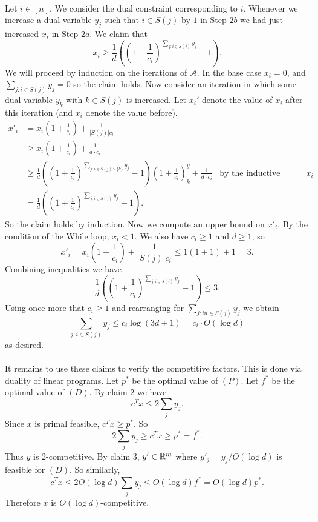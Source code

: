 \documentclass[letterpaper,12pt,oneside,onecolumn]{article}
\newcommand{\cA}{\mathcal{A}} \newcommand{\cB}{\mathcal{B}}
\newenvironment{proof}{{\bf Proof:  }}{\hfill\rule{2mm}{2mm}}
\begin{document}
\begin{proof}
\paragraph{}
Let $i \in [n]$. We consider the dual constraint corresponding to $i$. Whenever we increase a dual variable $y_j$ such that $i \in S(j)$ by $1$ in Step $2b$ we had just increased $x_i$ in Step $2a$. We claim that 
$$x_i \geq \frac{1}{d}((1+\frac{1}{c_i})^{\sum_{j : i \in S(j)} y_j} - 1).$$
We will proceed by induction on the iterations of $\cA$. In the base case $x_i = 0$, and $\sum_{j : i \in S(j)} y_j = 0$ so the claim holds. Now consider an iteration in which some dual variable $y_k$ with $k \in S(j)$ is increased. Let $x_i'$ denote the value of $x_i$ after this iteration (and $x_i$ denote the value before).
\begin{align*}
x'_i &= x_i(1 + \frac{1}{c_i}) + \frac{1}{|S(j)|c_i} \\
&\geq x_i(1+\frac{1}{c_i}) + \frac{1}{d\cdot c_i} \\
&\geq \frac{1}{d}((1+\frac{1}{c_i})^{\sum_{j : i \in S(j)\backslash\{k\}}y_j} - 1)(1 + \frac{1}{c_i})^y_k + \frac{1}{d\cdot c_i} &\text{by the inductive hypothesis on $x_i$} \\
&= \frac{1}{d}((1+\frac{1}{c_i})^{\sum_{j :i \in S(j)} y_j} -1).
\end{align*}
So the claim holds by induction. Now we compute an upper bound on $x'_i$. By the condition of the While loop, $x_i <1$. We also have $c_i \geq 1$ and $d\geq 1$, so
$$x'_i =  x_i(1 + \frac{1}{c_i}) + \frac{1}{|S(j)|c_i} \leq 1(1+1) + 1 = 3.$$
Combining inequalities we have
$$ \frac{1}{d}((1+\frac{1}{c_i})^{\sum_{j :i \in S(j)} y_j} -1) \leq 3.$$
Using once more that $c_i \geq 1$ and rearranging for $\sum_{j : in \in S(j)} y_j$ we obtain
$$\sum_{j : i \in S(j)} y_j \leq c_i \log(3d+1) = c_i \cdot O(\log d)$$
as desired.
\paragraph{}
It remains to use these claims to verify the competitive factors. This is done via duality of linear programs. Let $p^*$ be the optimal value of $(P)$. Let $f^*$ be the optimal value of $(D)$. By claim $2$ we have
$$c^Tx \leq 2 \sum_{j} y_j.$$
Since $x$ is primal feasible, $c^Tx \geq p^*$. So 
$$2\sum_j y_j \geq c^Tx \geq p^* = f^*.$$
Thus $y$ is $2$-competitive. By claim $3$, $y' \in \mathbb{R}^m$ where $y'_j = y_j/O(\log d)$ is feasible for $(D)$.
So similarly,
$$c^Tx \leq 2 O(\log d) \sum_j y_j \leq O(\log d) f^* = O(\log d) p^*.$$
Therefore $x$ is $O(\log d)$-competitive.
\end{proof}
\end{document}
